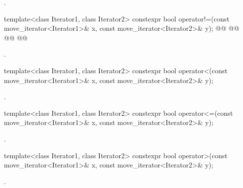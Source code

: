 \begin{itemdescr}
\pnum
\returns {}.
\end{itemdescr}

%
\begin{itemdecl}
template<class Iterator1, class Iterator2>
constexpr bool operator!=(const move_iterator<Iterator1>& x, const move_iterator<Iterator2>& y);
@@
@@
@@
@@
\end{itemdecl}

\begin{itemdescr}
\pnum
\returns {}.
\end{itemdescr}

%
\begin{itemdecl}
template<class Iterator1, class Iterator2>
constexpr bool operator<(const move_iterator<Iterator1>& x, const move_iterator<Iterator2>& y);
\end{itemdecl}

\begin{itemdescr}
\pnum
\returns {}.
\end{itemdescr}

%
\begin{itemdecl}
template<class Iterator1, class Iterator2>
constexpr bool operator<=(const move_iterator<Iterator1>& x, const move_iterator<Iterator2>& y);
\end{itemdecl}

\begin{itemdescr}
\pnum
\returns {}.
\end{itemdescr}

%
\begin{itemdecl}
template<class Iterator1, class Iterator2>
constexpr bool operator>(const move_iterator<Iterator1>& x, const move_iterator<Iterator2>& y);
\end{itemdecl}

\begin{itemdescr}
\pnum
\returns {}.
\end{itemdescr}

